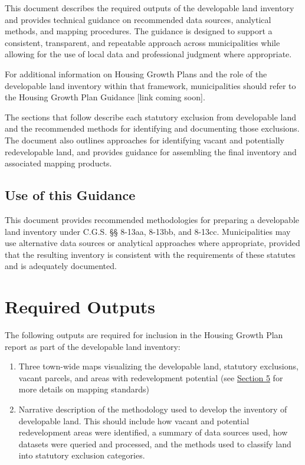 \documentclass[
  letterpaper,
  DIV=11,
  numbers=noendperiod]{scrreprt}
\begin{document}
This document describes the required outputs of the developable land
inventory and provides technical guidance on recommended data sources,
analytical methods, and mapping procedures. The guidance is designed to
support a consistent, transparent, and repeatable approach across
municipalities while allowing for the use of local data and professional
judgment where appropriate.

For additional information on Housing Growth Plans and the role of the
developable land inventory within that framework, municipalities should
refer to the Housing Growth Plan Guidance {[}link coming soon{]}.

The sections that follow describe each statutory exclusion from
developable land and the recommended methods for identifying and
documenting those exclusions. The document also outlines approaches for
identifying vacant and potentially redevelopable land, and provides
guidance for assembling the final inventory and associated mapping
products.\\

\section{Use of this Guidance}\label{use-of-this-guidance}

This document provides recommended methodologies for preparing a
developable land inventory under C.G.S. §§ 8-13aa, 8-13bb, and 8-13cc.
Municipalities may use alternative data sources or analytical approaches
where appropriate, provided that the resulting inventory is consistent
with the requirements of these statutes and is adequately documented.


\chapter{Required Outputs}\label{required-outputs}

The following outputs are required for inclusion in the Housing Growth
Plan report as part of the developable land inventory:

\begin{enumerate}
\def\labelenumi{\arabic{enumi}.}
\item
  Three town-wide maps visualizing the developable land, statutory
  exclusions, vacant parcels, and areas with redevelopment potential
  (see \href{map.qmd}{Section 5} for more details on mapping standards)
\item
  Narrative description of the methodology used to develop the inventory
  of developable land. This should include how vacant and potential
  redevelopment areas were identified, a summary of data sources used,
  how datasets were queried and processed, and the methods used to
  classify land into statutory exclusion categories.
\end{enumerate}
\end{document}
